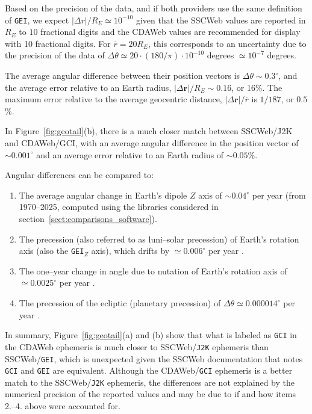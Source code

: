\documentclass[draft]{agujournal2019}
\begin{document}
Based on the precision of the data, and if both providers use the same definition of \texttt{GEI}, we expect $|\Delta r|/R_E \simeq 10^{-10}$ given that the SSCWeb values are reported in $R_E$ to $10$ fractional digits and the CDAWeb values are recommended for display with 10 fractional digits. For $\overline{r}=20 R_E$, this corresponds to an uncertainty due to the precision of the data of $\Delta \theta \simeq 20\cdot (180/\pi) \cdot 10^{-10}$ degrees $\simeq 10^{-7}$ degrees.

The average angular difference between their position vectors is $\Delta \theta \sim 0.3^\circ$, and the average error relative to an Earth radius, $|\Delta\mathbf{r}|/R_E\sim 0.16$, or 16\%. The maximum error relative to the average geocentric distance, $|\Delta \mathbf{r}|/\overline{r}$ is $1/187$, or $0.5$\%.

In Figure~\ref{fig:geotail}(b), there is a much closer match between SSCWeb/J2K and CDAWeb/GCI, with an average angular difference in the position vector of ${\sim}0.001^\circ$ and an average error relative to an Earth radius of ${\sim}0.05$\%. 

Angular differences can be compared to:
\begin{enumerate}

    \item The average angular change in Earth's dipole $Z$ axis of ${\sim} 0.04^\circ$ per year (from 1970--2025, computed using the libraries considered in section~\ref{sect:comparisons_software}).

    \item The precession (also referred to as luni--solar precession) of Earth's rotation axis (also the \texttt{GEI}$_Z$ axis), which drifts by $\simeq 0.006^\circ$ per year \cite{Hapgood1995}.

    \item The one--year change in angle due to nutation of Earth's rotation axis of $\simeq 0.0025^\circ$ per year \cite{Hapgood1995}.
    
    \item The precession of the ecliptic (planetary precession) of $\Delta \theta \simeq 0.000014^\circ$ per year \cite{Hapgood1995}.
\end{enumerate}

In summary, Figure~\ref{fig:geotail}(a) and (b) show that what is labeled as \texttt{GCI} in the CDAWeb ephemeris is much closer to SSCWeb/\texttt{J2K} ephemeris than SSCWeb/\texttt{GEI}, which is unexpected given the SSCWeb documentation that notes \texttt{GCI} and \texttt{GEI} are equivalent. Although the CDAWeb/\texttt{GCI} ephemeris is a better match to the SSCWeb/\texttt{J2K} ephemeris, the differences are not explained by the numerical precision of the reported values and may be due to if and how items 2.--4. above were accounted for.
\end{document}
